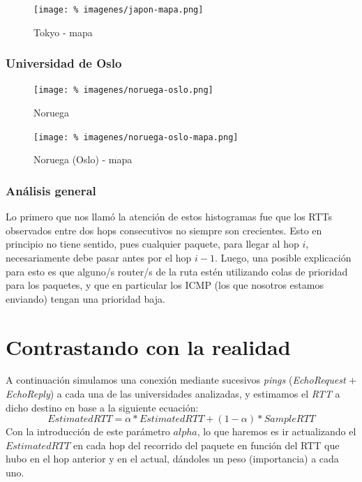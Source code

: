 \documentclass[final,inline,a4paper,narroweqnarray]{ieee}
\begin{document}
\begin{figure}[ht]\begin{center}
   \texttt{[image: \%
    imagenes/japon-mapa.png]}
    \caption{Tokyo - mapa}
    \label{tokyo-mapa}
\end{center}\end{figure}

\subsubsection{Universidad de Oslo}
\begin{figure}[ht]\begin{center}
   \texttt{[image: \%
    imagenes/noruega-oslo.png]}
    \caption{Noruega}
    \label{noruega-rtt-zrtt}
\end{center}\end{figure}

\begin{figure}[ht]\begin{center}
   \texttt{[image: \%
    imagenes/noruega-oslo-mapa.png]}
    \caption{Noruega (Oslo) - mapa}
    \label{noruega-mapa}
\end{center}\end{figure}

\subsubsection{Análisis general}

Lo primero que nos llamó la atención de estos histogramas fue que los RTTs
observados entre dos hops consecutivos no siempre son crecientes. Esto en
principio no tiene sentido, pues cualquier paquete, para llegar al hop $i$,
necesariamente debe pasar antes por el hop $i-1$. Luego, una posible explicación
para esto es que alguno/s router/s de la ruta estén utilizando colas de
prioridad para los paquetes, y que en particular los ICMP (los que nosotros
estamos enviando) tengan una prioridad baja.

\section{Contrastando con la realidad}

A continuación simulamos una conexión mediante sucesivos \emph{pings}
(\emph{EchoRequest} $+$ \emph{EchoReply}) a cada una de las universidades
analizadas, y estimamos el \emph{RTT} a dicho destino en base a la siguiente
ecuación:
\[
EstimatedRTT = \alpha * EstimatedRTT + (1 - \alpha) * SampleRTT
\]
Con la introducción de este parámetro $alpha$, lo que haremos es ir actualizando
el $EstimatedRTT$ en cada hop del recorrido del paquete en función del RTT que
hubo en el hop anterior y en el actual, dándoles un peso (importancia) a cada
uno.
\end{document}
